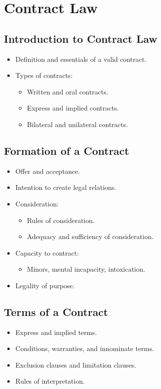 \chapter{Contract Law}

\section{Introduction to Contract Law}
\begin{itemize}
    \item Definition and essentials of a valid contract.
    \item Types of contracts:
    \begin{itemize}
        \item Written and oral contracts.
        \item Express and implied contracts.
        \item Bilateral and unilateral contracts.
    \end{itemize}
\end{itemize}

\section{Formation of a Contract}
\begin{itemize}
    \item Offer and acceptance.
    \item Intention to create legal relations.
    \item Consideration:
    \begin{itemize}
        \item Rules of consideration.
        \item Adequacy and sufficiency of consideration.
    \end{itemize}
    \item Capacity to contract:
    \begin{itemize}
        \item Minors, mental incapacity, intoxication.
    \end{itemize}
    \item Legality of purpose.
\end{itemize}

\section{Terms of a Contract}
\begin{itemize}
    \item Express and implied terms.
    \item Conditions, warranties, and innominate terms.
    \item Exclusion clauses and limitation clauses.
    \item Rules of interpretation.
\end{itemize}

